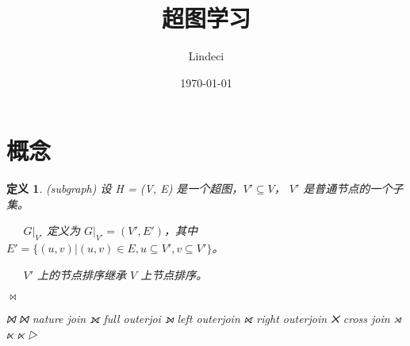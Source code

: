 \documentclass[fontset=none]{ctexart}
\title{超图学习}
\author{Lindeci}
\date{\today}
\begin{document}
\maketitle
\tableofcontents


\section{概念}

\newtheorem{definition}{定义}


\begin{definition}{(subgraph)}
    设 H = (V, E) 是一个超图，$V' \subseteq V$， $V'$ 是普通节点的一个子集。

    \ \ \ $G|_{V'}$ 定义为 $G|_{V'} = (V',E')$，其中 $E' = \{(u,v)|(u,v) \in E,u \subseteq V',v \subseteq V'\}$。
    
    \ \ \ $V'$ 上的节点排序继承 $V$ 上节点排序。

    $\Join $
 
    ⨝
    ⨝ nature join
    ⟗ full outerjoi
    ⟕ left outerjoin
    ⟖ right outerjoin
    ✕ cross join
    ⋊ 
    ⋉ 
    ⋉
    ▷

\end{definition}
\end{document}
